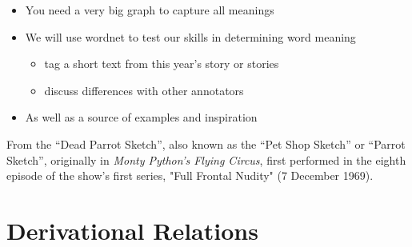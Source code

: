 \documentclass[headrule,footrule]{foils}
\begin{document}
\begin{itemize}
\item You need a very big graph to capture all meanings
\end{itemize}




\begin{itemize}
\item We will use wordnet to test our skills in determining word meaning
  \begin{itemize}
  \item tag a short text from this year's story or stories
  \item discuss differences with other annotators
 \end{itemize}
\item As well as a source of examples and inspiration
\end{itemize}





\begin{quote} \large
\end{quote}

From the ``Dead Parrot Sketch'', also known as the ``Pet Shop Sketch''
or ``Parrot Sketch'', originally in \textit{Monty Python's Flying Circus},
first performed in the eighth episode of the show's first series,
"Full Frontal Nudity" (7 December 1969).

\section{Derivational Relations}


\end{document}
